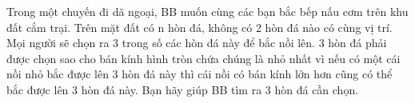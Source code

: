 Trong một chuyến đi dã ngoại, BB muốn cùng các bạn bắc bếp nấu cơm trên khu đất cắm trại. Trên mặt đất có n hòn đá, không có 2 hòn đá nào có cùng vị trí. Mọi người sẽ chọn ra 3 trong số các hòn đá này để bắc nồi lên. 3 hòn đá phải được chọn sao cho bán kính hình tròn chứa chúng là nhỏ nhất vì nếu có một cái nồi nhỏ bắc được lên 3 hòn đá này thì cái nồi có bán kính lớn hơn cũng có thể bắc được lên 3 hòn đá này. Bạn hãy giúp BB tìm ra 3 hòn đá cần chọn.  

\